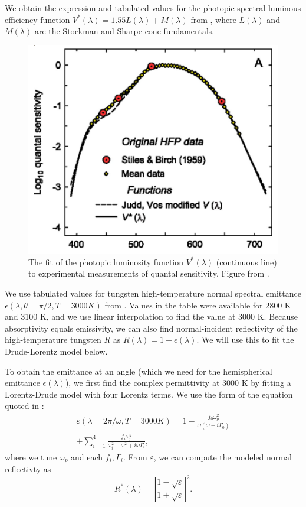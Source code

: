 \documentclass[%
 reprint,
 amsmath,amssymb,
 aps
]{revtex4-2}
\begin{document}
We obtain the expression and tabulated values for the photopic spectral luminous efficiency function $V^*(\lambda) = 1.55 L(\lambda) + M(\lambda)$ from \cite{sharpe}, where $L(\lambda)$ and $M(\lambda)$ are the Stockman and Sharpe cone fundamentals.

\begin{figure}
\includegraphics[width=.8\linewidth]{sharpe.PNG}

\caption{The fit of the photopic luminosity function $V^*(\lambda)$ (continuous line) to experimental measurements of quantal sensitivity. Figure from \cite{sharpe}.}
\end{figure}

We use tabulated values for tungsten high-temperature normal spectral emittance $\epsilon(\lambda, \theta=\pi/2, T=3000 K)$ from \cite{touloukian}. Values in the table were available for 2800 K and 3100 K, and we use linear interpolation to find the value at 3000 K. Because absorptivity equals emissivity, we can also find normal-incident reflectivity of the high-temperature tungsten $R$ as $R(\lambda) = 1 - \epsilon(\lambda)$. We will use this to fit the Drude-Lorentz model below.

To obtain the emittance at an angle (which we need for the hemispherical emittance $\epsilon (\lambda)$), we first find the complex permittivity at 3000 K by fitting a Lorentz-Drude model with four Lorentz terms. We use the form of the equation quoted in \cite{minissale}: \begin{equation}\begin{multlined}\varepsilon(\lambda = 2\pi/\omega, T=3000K) = 1-\frac{f_0 \omega_p^2}{\omega(\omega-i\Gamma_0)} \\+ \sum_{i=1}^4 \frac{f_i \omega_p^2}{\omega_i^2 - \omega^2 + i\omega\Gamma_i},\end{multlined}\end{equation}
where we tune $\omega_p$ and each $f_i, \Gamma_i$. From $\varepsilon$, we can compute the modeled normal reflectivty as \begin{equation}R^*(\lambda) = \left |\frac{1-\sqrt{\varepsilon}}{1+\sqrt{\varepsilon}} \right |^2.\end{equation}
\end{document}
